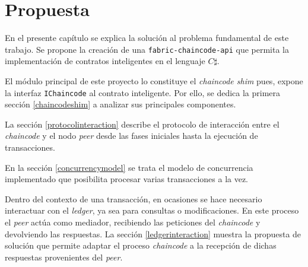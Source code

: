 \chapter{Propuesta}\label{chapter:proposal}
En el presente capítulo se explica la solución al problema fundamental de este trabajo. Se propone la creación de una \texttt{fabric-chaincode-api} que permita la implementación de contratos inteligentes en el lenguaje $ C\sharp $.

El módulo principal de este proyecto lo constituye el \textit{chaincode shim }pues, expone la interfaz \texttt{IChaincode} al contrato inteligente. Por ello, se dedica la primera sección \ref{chaincodeshim} a analizar sus principales componentes.

La sección \ref{protocolinteraction} describe el protocolo de interacción entre el \textit{chaincode} y el nodo \textit{peer} desde las fases iniciales hasta la ejecución de transacciones.

En la sección \ref{concurrencymodel} se trata el modelo de concurrencia implementado que posibilita procesar varias transacciones a la vez.

Dentro del contexto de una transacción, en ocasiones se hace necesario interactuar con el \textit{ledger}, ya sea para consultas o modificaciones. En este proceso el \textit{peer} actúa como mediador, recibiendo las peticiones del \textit{chaincode} y devolviendo las respuestas. La sección \ref{ledgerinteraction} muestra la propuesta de solución que permite adaptar el proceso \textit{chaincode} a la recepción de dichas respuestas provenientes del \textit{peer}.

%

